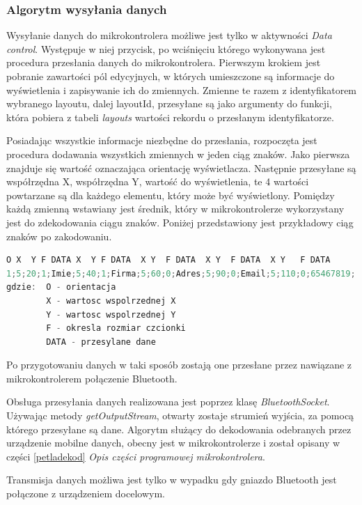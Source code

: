 \documentclass[a4paper,12pt, twoside]{article}
\begin{document}
    	\subsubsection{Algorytm wysyłania danych}
    	Wysyłanie danych do mikrokontrolera możliwe jest tylko w aktywności \textit{Data control}. Występuje w niej przycisk, po wciśnięciu którego wykonywana jest procedura przesłania danych do mikrokontrolera. Pierwszym krokiem jest pobranie zawartości pól edycyjnych, w których umieszczone są informacje do wyświetlenia i zapisywanie ich do zmiennych. Zmienne te razem z identyfikatorem wybranego layoutu, dalej layoutId, przesyłane są jako argumenty do funkcji, która pobiera z tabeli \textit{layouts} wartości rekordu o przesłanym identyfikatorze.
    	
    	Posiadając wszystkie informacje niezbędne do przesłania, rozpoczęta jest procedura dodawania wszystkich zmiennych w jeden ciąg znaków. Jako pierwsza znajduje się wartość oznaczająca orientację wyświetlacza. Następnie przesyłane są współrzędna X, współrzędna Y, wartość do wyświetlenia, te 4 wartości powtarzane są dla każdego elementu, który może być wyświetlony. Pomiędzy każdą zmienną wstawiany jest średnik, który w mikrokontrolerze wykorzystany jest do zdekodowania ciągu znaków. Poniżej przedstawiony jest przykładowy ciąg znaków po zakodowaniu.
    	\begin{lstlisting}[language=C++, label={lst:petlaprzepisujaca}, caption=Przykładowy ciąg przesyłanych danych]
O X  Y F DATA X  Y F DATA  X Y  F DATA  X Y  F DATA  X Y   F DATA	
1;5;20;1;Imie;5;40;1;Firma;5;60;0;Adres;5;90;0;Email;5;110;0;65467819;
gdzie:  O - orientacja
        X - wartosc wspolrzednej X
        Y - wartosc wspolrzednej Y
        F - okresla rozmiar czcionki
        DATA - przesylane dane\end{lstlisting}
    
    	Po przygotowaniu danych w taki sposób zostają one przesłane przez nawiązane z mikrokontrolerem połączenie Bluetooth.

    	Obsługa przesyłania danych realizowana jest poprzez klasę \textit{BluetoothSocket}. Używając metody \textit{getOutputStream}\cite{outputstream}, otwarty zostaje strumień wyjścia, za pomocą którego przesyłane są dane. Algorytm służący do dekodowania odebranych przez urządzenie mobilne danych, obecny jest w mikrokontrolerze i został opisany w części \ref{petladekod} \textit{Opis części programowej mikrokontrolera}.
    	
    	Transmisja danych możliwa jest tylko w wypadku gdy gniazdo Bluetooth jest połączone z urządzeniem docelowym.
	
\end{document}
